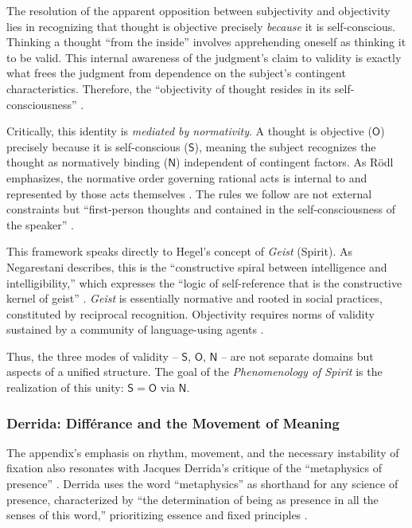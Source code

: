\documentclass[12pt]{book}
\begin{document}
The resolution of the apparent opposition between subjectivity and objectivity lies in recognizing that thought is objective precisely \textit{because} it is self-conscious. Thinking a thought ``from the inside'' involves apprehending oneself as thinking it to be valid. This internal awareness of the judgment's claim to validity is exactly what frees the judgment from dependence on the subject's contingent characteristics. Therefore, the ``objectivity of thought resides in its self-consciousness'' \parencite[11]{Rodl:2018aa}.

Critically, this identity is \textit{mediated by normativity}. A thought is objective ($\mathsf{O}$) precisely because it is self-conscious ($\mathsf{S}$), meaning the subject recognizes the thought as normatively binding ($\mathsf{N}$) independent of contingent factors. As Rödl emphasizes, the normative order governing rational acts is internal to and represented by those acts themselves \parencite{Rodl:2007aa, Negarestani2018}. The rules we follow are not external constraints but ``first-person thoughts and contained in the self-consciousness of the speaker'' \parencite[33]{Rodl:2018aa}.

This framework speaks directly to Hegel's concept of \textit{Geist} (Spirit). As Negarestani describes, this is the ``constructive spiral between intelligence and intelligibility,'' which expresses the ``logic of self-reference that is the constructive kernel of geist'' \parencite[25]{Negarestani2018}. \textit{Geist} is essentially normative and rooted in social practices, constituted by reciprocal recognition. Objectivity requires norms of validity sustained by a community of language-using agents \parencite{Negarestani2018}.

Thus, the three modes of validity -- $\mathsf{S}$, $\mathsf{O}$, $\mathsf{N}$ -- are not separate domains but aspects of a unified structure. The goal of the \emph{Phenomenology of Spirit} is the realization of this unity: $\mathsf{S} = \mathsf{O}$ via $\mathsf{N}$.

\subsubsection{Derrida: Différance and the Movement of Meaning}

The appendix's emphasis on rhythm, movement, and the necessary instability of fixation also resonates with Jacques Derrida's critique of the ``metaphysics of presence'' \parencite{Derrida2011}. Derrida uses the word ``metaphysics'' as shorthand for any science of presence, characterized by ``the determination of being as presence in all the senses of this word,'' prioritizing essence and fixed principles \parencite[p. xxi]{Derrida1997}.
\end{document}
